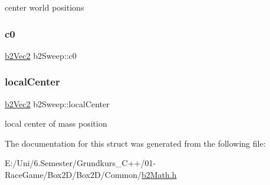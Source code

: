 center world positions 

\mbox{\label{structb2_sweep_a16dacd7188f3c7b2adef3242012587d8}} 
\subsubsection{\texorpdfstring{c0}{c0}}
{\footnotesize\ttfamily \mbox{\hyperlink{structb2_vec2}{b2\+Vec2}} b2\+Sweep\+::c0}

\mbox{\label{structb2_sweep_a4bcc302cf78771896d6256fc53f2f8be}} 
\subsubsection{\texorpdfstring{localCenter}{localCenter}}
{\footnotesize\ttfamily \mbox{\hyperlink{structb2_vec2}{b2\+Vec2}} b2\+Sweep\+::local\+Center}



local center of mass position 



The documentation for this struct was generated from the following file\+:\begin{DoxyCompactItemize}
\item 
E\+:/\+Uni/6.\+Semester/\+Grundkurs\+\_\+\+C++/01-\/\+Race\+Game/\+Box2\+D/\+Box2\+D/\+Common/\mbox{\hyperlink{b2_math_8h}{b2\+Math.\+h}}\end{DoxyCompactItemize}
